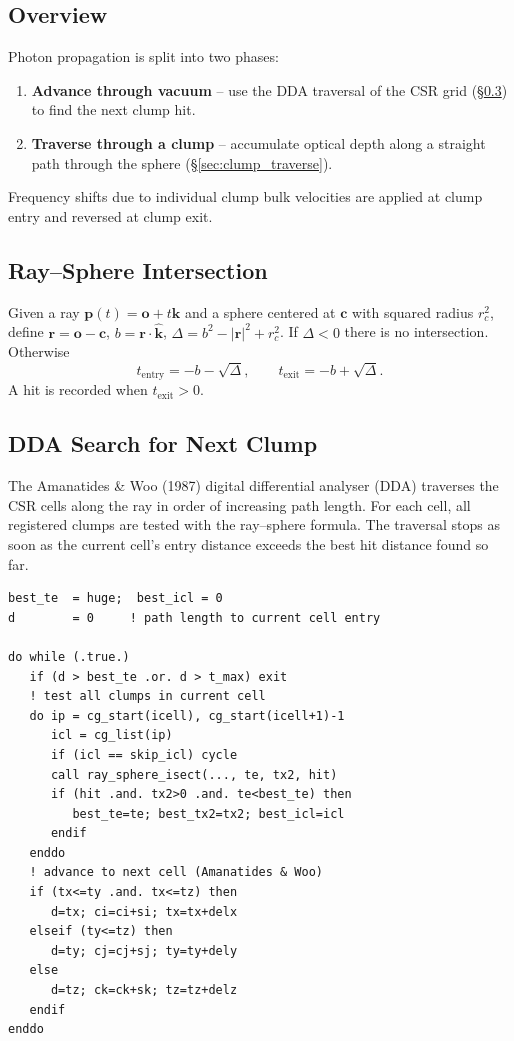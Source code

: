 \documentclass[english,a4paper]{my_memo}
\begin{document}
\subsection{Overview}

Photon propagation is split into two phases:

\begin{enumerate}
  \item \textbf{Advance through vacuum} -- use the DDA traversal of the CSR
        grid (\S\ref{sec:dda}) to find the next clump hit.
  \item \textbf{Traverse through a clump} -- accumulate optical depth along
        a straight path through the sphere (\S\ref{sec:clump_traverse}).
\end{enumerate}

Frequency shifts due to individual clump bulk velocities are applied at
clump entry and reversed at clump exit.

\subsection{Ray--Sphere Intersection}

Given a ray $\mathbf{p}(t) = \mathbf{o} + t\hat{\mathbf{k}}$ and a sphere
centered at $\mathbf{c}$ with squared radius $r_c^2$, define
$\mathbf{r} = \mathbf{o} - \mathbf{c}$, $b = \mathbf{r}\cdot\hat{\mathbf{k}}$,
$\Delta = b^2 - |\mathbf{r}|^2 + r_c^2$.  If $\Delta < 0$ there is no
intersection.  Otherwise
\begin{equation}
  t_\mathrm{entry} = -b - \sqrt{\Delta},\qquad
  t_\mathrm{exit}  = -b + \sqrt{\Delta}.
\end{equation}
A hit is recorded when $t_\mathrm{exit} > 0$.

\subsection{DDA Search for Next Clump}
\label{sec:dda}

The Amanatides \& Woo (1987) digital differential analyser (DDA) traverses
the CSR cells along the ray in order of increasing path length.  For each
cell, all registered clumps are tested with the ray--sphere formula.  The
traversal stops as soon as the current cell's entry distance exceeds the
best hit distance found so far.

\begin{lstlisting}
best_te  = huge;  best_icl = 0
d        = 0     ! path length to current cell entry

do while (.true.)
   if (d > best_te .or. d > t_max) exit
   ! test all clumps in current cell
   do ip = cg_start(icell), cg_start(icell+1)-1
      icl = cg_list(ip)
      if (icl == skip_icl) cycle
      call ray_sphere_isect(..., te, tx2, hit)
      if (hit .and. tx2>0 .and. te<best_te) then
         best_te=te; best_tx2=tx2; best_icl=icl
      endif
   enddo
   ! advance to next cell (Amanatides & Woo)
   if (tx<=ty .and. tx<=tz) then
      d=tx; ci=ci+si; tx=tx+delx
   elseif (ty<=tz) then
      d=ty; cj=cj+sj; ty=ty+dely
   else
      d=tz; ck=ck+sk; tz=tz+delz
   endif
enddo
\end{lstlisting}
\end{document}
